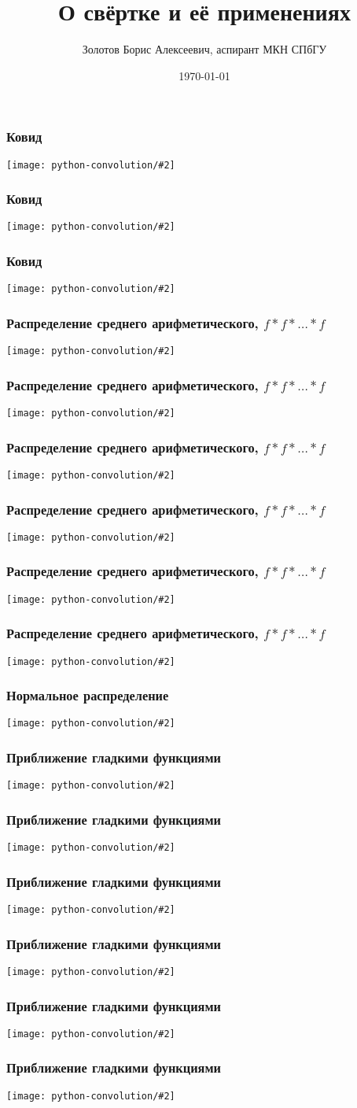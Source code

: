\documentclass[11pt,aspectratio=169,svgnames]{beamer}
\title{О свёртке и её применениях}
\date{\today}
\author{Золотов Борис Алексеевич, аспирант МКН СПбГУ}
\institute{«Лига Лекторов», 3 сезон}
\newcommand{\graslide}[2]{
   \begin{frame} \frametitle{#1}
      \texttt{[image: python-convolution/\#2]}
   \end{frame}
}
\newcommand{\probtitle}{Распределение среднего арифметического, \(f * f * \ldots * f\)}
\begin{document}
 \maketitle

\graslide{Ковид}{covid-0}
\graslide{Ковид}{covid-1}
\graslide{Ковид}{covid-2}


\graslide{\probtitle}{probability-0}
\graslide{\probtitle}{probability-1}
\graslide{\probtitle}{probability-2}
\graslide{\probtitle}{probability-3}
\graslide{\probtitle}{probability-4}
\graslide{\probtitle}{probability-5}


\graslide{Нормальное распределение}{normal}
\graslide{Приближение гладкими функциями}{smoothing-0}
\graslide{Приближение гладкими функциями}{smoothing-2.00}
\graslide{Приближение гладкими функциями}{smoothing-1.00}
\graslide{Приближение гладкими функциями}{smoothing-0.50}
\graslide{Приближение гладкими функциями}{smoothing-0.20}
\graslide{Приближение гладкими функциями}{smoothing-0.05}
\end{document}
